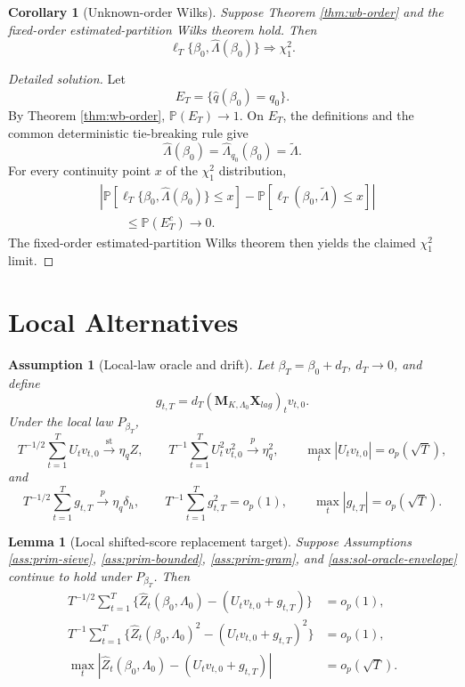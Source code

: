 \documentclass[12pt]{article}
\numberwithin{equation}{section}
\newtheorem{lemma}{Lemma}
\newtheorem{corollary}{Corollary}
\newtheorem{assumption}{Assumption}
\theoremstyle{definition}
\newcommand{\Pp}{\mathbb P}
\begin{document}
\begin{corollary}[Unknown-order Wilks]
\label{cor:wb-unknown-wilks}
Suppose Theorem \ref{thm:wb-order} and the fixed-order
estimated-partition Wilks theorem hold.  Then
\[
    \ell_T\{\beta_0,\widehat\Lambda(\beta_0)\}\Rightarrow\chi_1^2.
\]
\end{corollary}


\begin{proof}[Detailed solution]
Let
\[
    E_T=\{\widehat q(\beta_0)=q_0\}.
\]
By Theorem \ref{thm:wb-order}, \(\Pp(E_T)\to1\).  On \(E_T\), the definitions
and the common deterministic tie-breaking rule give
\[
    \widehat\Lambda(\beta_0)
    =\widehat\Lambda_{q_0}(\beta_0)
    =\widetilde\Lambda.
\]
For every continuity point \(x\) of the \(\chi_1^2\) distribution,
\begin{align*}
    &\left|
      \Pp\left[
        \ell_T\{\beta_0,\widehat\Lambda(\beta_0)\}\leq x
      \right]
      -\Pp\left[
        \ell_T(\beta_0,\widetilde\Lambda)\leq x
      \right]
    \right|\\
    &\qquad\leq \Pp(E_T^c)\to0.
\end{align*}
The fixed-order estimated-partition Wilks theorem then yields the claimed
\(\chi_1^2\) limit.
\end{proof}


\section{Local Alternatives}

\begin{assumption}[Local-law oracle and drift]
\label{ass:wb-local-oracle}
Let \(\beta_T=\beta_0+d_T\), \(d_T\to0\), and define
\[
    g_{t,T}=d_T(\bm M_{K,\Lambda_0}\bm X_{lag})_tv_{t,0}.
\]
Under the local law \(P_{\beta_T}\),
\[
    T^{-1/2}\sum_{t=1}^TU_tv_{t,0}\xrightarrow{\mathrm{st}}\eta_qZ,
    \qquad
    T^{-1}\sum_{t=1}^TU_t^2v_{t,0}^2\xrightarrow{p}\eta_q^2,
    \qquad
    \max_t|U_tv_{t,0}|=o_p(\sqrt T),
\]
and
\[
    T^{-1/2}\sum_{t=1}^Tg_{t,T}\xrightarrow{p}\eta_q\delta_h,
    \qquad
    T^{-1}\sum_{t=1}^Tg_{t,T}^2=o_p(1),
    \qquad
    \max_t|g_{t,T}|=o_p(\sqrt T).
\]
\end{assumption}

\begin{lemma}[Local shifted-score replacement target]
\label{lem:wb-local-replacement}
Suppose Assumptions \ref{ass:prim-sieve}, \ref{ass:prim-bounded},
\ref{ass:prim-gram}, and \ref{ass:sol-oracle-envelope} continue to hold under
\(P_{\beta_T}\).  Then
\begin{align}
    T^{-1/2}\sum_{t=1}^T
    \{\widehat Z_t(\beta_0,\Lambda_0)-(U_tv_{t,0}+g_{t,T})\}
    &=o_p(1),
    \\
    T^{-1}\sum_{t=1}^T
    \{\widehat Z_t(\beta_0,\Lambda_0)^2-(U_tv_{t,0}+g_{t,T})^2\}
    &=o_p(1),
    \\
    \max_t|\widehat Z_t(\beta_0,\Lambda_0)-(U_tv_{t,0}+g_{t,T})|
    &=o_p(\sqrt T).
\end{align}
\end{lemma}
\end{document}
